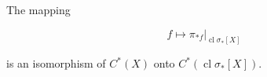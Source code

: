 The mapping

$$f \mapsto \pi_{*f} \big|_{\operatorname{cl} \sigma_*[X]}$$

is an isomorphism of $C^*(X)$ onto $C^*(\operatorname{cl} \sigma_*[X])$.
